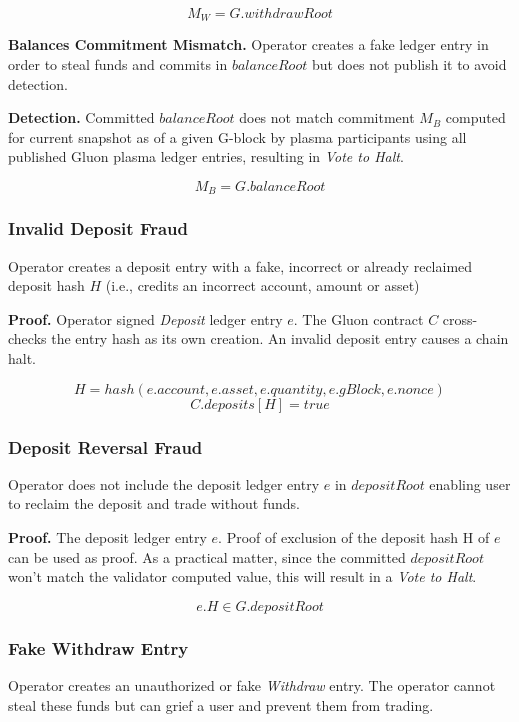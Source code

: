 \documentclass[12pt,a4paper]{article}
\begin{document}
\begin{equation}
M_W = G.withdrawRoot
\end{equation}

\textbf{Balances Commitment Mismatch.} Operator creates a fake ledger entry in order to steal funds and commits in $balanceRoot$ but does not publish it to avoid detection.

\textbf{Detection.} Committed $balanceRoot$ does not match commitment $M_B$ computed for current snapshot as of a given G-block by plasma participants using all published Gluon plasma ledger entries, resulting in \emph{Vote to Halt}.

\begin{equation}
M_B = G.balanceRoot
\end{equation}

\subsubsection{Invalid Deposit Fraud}\label{fp:idf}
Operator creates a deposit entry with a fake, incorrect or already reclaimed deposit hash $H$ (i.e., credits an incorrect account, amount or asset)

\textbf{Proof.}
Operator signed \emph{Deposit} ledger entry $e$. The Gluon contract $C$ cross-checks the entry hash as its own creation. An invalid deposit entry causes a chain halt.

    \[ H = hash(e.account, e.asset, e.quantity, e.gBlock, e.nonce) \]
    \begin{equation}
    C.deposits[H] = true
    \end{equation}


\subsubsection{Deposit Reversal Fraud}\label{fp:drf}
Operator does not include the deposit ledger entry $e$ in $depositRoot$ enabling user to reclaim the deposit and trade without funds.

\textbf{Proof.} The deposit ledger entry $e$. Proof of exclusion of the deposit hash H of $e$ can be used as proof. As a practical matter, since the committed $depositRoot$ won't match the validator computed value, this will result in a \emph{Vote to Halt}.

\begin{equation}
    e.H \in G.depositRoot
\end{equation}

\subsubsection{Fake Withdraw Entry} \label{fp:fwe}
Operator creates an unauthorized or fake \emph{Withdraw} entry. The operator cannot steal these funds but can grief a user and prevent them from trading.
\end{document}
